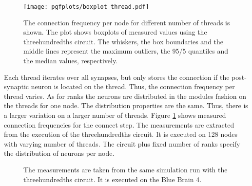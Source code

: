 \newpage
\begin{figure}[ht!]
\centering
\texttt{[image: pgfplots/boxplot\_thread.pdf]}
\caption[The connection frequency per node for different number of threads is shown]{The connection frequency per node for different number of threads is shown.
The plot shows boxplots of measured values using the threehundredths circuit.
The whiskers, the box boundaries and the middle lines represent the maximum outliers,
the 95/5 quantiles and the median values, respectively.
}
\label{boxplotnewcon}
\end{figure}

Each thread iterates over all synapses, but only stores the connection if the post-synaptic neuron is located on
the thread. Thus, the connection frequency per thread varies.
As for ranks the neurons are distributed in the modules fashion on the threads for one node.
The distribution properties are the same. Thus, there is a larger variation on a larger number of threads.
Figure \ref{boxplotnewcon} shows measured connection frequencies for the connect step. The measurements are
extracted from the execution of the threehundredths circuit. It is executed on 128 nodes with varying number of
threads. The circuit plus fixed number of ranks specify the distribution of neurons per node.

\begin{figure}[ht!]
     \begin{center}
        \hspace{0.2cm}
    \end{center}
    \caption[The measurements are taken from the same simulation run with the threehundredths circuit]{%
        The measurements are taken from the same simulation run with the threehundredths circuit. It is executed on the Blue Brain 4.
     }%
   \label{detailnewcon}
\end{figure}

